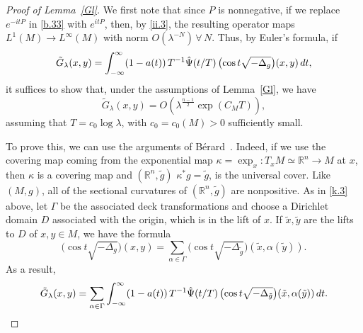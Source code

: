 \documentclass[10pt]{amsart}
\newcommand{\Rn}{{\mathbb R}^n}
\newcommand{\la}{\lambda}
\newcommand{\1}{{\bf 1}}
\begin{document}
\begin{proof}[Proof of Lemma~\ref{Gl}] 
We first note that since $P$ is nonnegative, if we replace $e^{-itP}$ in \eqref{b.33} with $e^{itP}$, then, by \eqref{ii.3}, 
the resulting operator maps $L^1(M)\to L^\infty(M)$ with norm $O(\la^{-N}) \, \forall \, N$.  Thus, by Euler's formula, if
\begin{equation}\label{k1}
\tilde G_\la(x,y)= \int_{-\infty}^\infty (1-a(t)) \, T^{-1}
\Hat \Psi(t/T) \, \bigl(\cos t\sqrt{-\Delta_g}\bigr)(x,y) \, dt,
\end{equation}
it suffices to show that, under the assumptions of Lemma~\ref{Gl}, we have
\begin{equation}\label{k.2}
\tilde G_\la(x,y)=O(\la^{\frac{n-1}2} \exp(C_MT)),
\end{equation}
assuming that $T=c_0\log\la$, with $c_0=c_0(M)>0$ sufficiently small.


To prove this, we can use the arguments of B\'erard~\cite{Berard}.  Indeed, if we use the covering map coming from
the exponential map $\kappa=\exp_x: T_xM \simeq \Rn \to M$ at $x$, then $\kappa$ is a covering map and
$(\Rn, \tilde g)$ $\kappa^*g=\tilde g$, is the universal cover.  Like $(M,g)$, all of the sectional curvatures of
$(\Rn,\tilde g)$ are nonpositive.  As in \eqref{k.3} above, let $\Gamma$ be the associated
deck transformations and choose a Dirichlet domain $D$ associated with the origin, which is  in the lift of $x$.
If $\tilde x,\tilde y$ are the lifts to $D$ of $x,y\in M$, we have the formula 
\begin{equation}\label{k.3'}
\bigl(\cos t\sqrt{-\Delta_g} \bigr)(x,y)=\sum_{\alpha\in \Gamma} \bigl(\cos t\sqrt{-\Delta_{\tilde g}} \bigr)(\tilde x, \alpha(\tilde y)).
\end{equation}
As a result, 
\begin{equation}\label{k.4}
\tilde G_\la(x,y)=\sum_{\alpha\in \Gamma}
\int_{-\infty}^\infty (1-a(t)) \, T^{-1}\Hat \Psi(t/T) \,
\bigl(\cos t\sqrt{-\Delta_{\tilde g}}\bigr)(\tilde x,\alpha(\tilde y)) \, dt.
\end{equation}



\end{proof}
\end{document}

